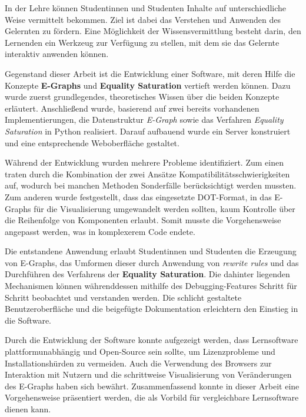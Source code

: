 In der Lehre können Studentinnen und Studenten Inhalte auf unterschiedliche Weise vermittelt bekommen. Ziel ist dabei das Verstehen und Anwenden des Gelernten zu fördern.
Eine Möglichkeit der Wissensvermittlung besteht darin, den Lernenden ein Werkzeug zur Verfügung zu stellen, mit dem sie das Gelernte interaktiv anwenden können.

Gegenstand dieser Arbeit ist die Entwicklung einer Software, mit deren Hilfe die Konzepte \textbf{E-Graphs} und \textbf{Equality Saturation} vertieft werden können.
Dazu wurde zuerst grundlegendes, theoretisches Wissen über die beiden Konzepte erläutert. 
Anschließend wurde, basierend auf zwei bereits vorhandenen Implementierungen, die Datenstruktur \textit{E-Graph} sowie das Verfahren \textit{Equality Saturation} in Python realisiert. 
Darauf aufbauend wurde ein Server konstruiert und eine entsprechende Weboberfläche gestaltet.

Während der Entwicklung wurden mehrere Probleme identifiziert. Zum einen traten durch die Kombination der zwei Ansätze Kompatibilitätsschwierigkeiten auf, wodurch bei manchen
Methoden Sonderfälle berücksichtigt werden mussten. Zum anderen wurde festgestellt, dass das eingesetzte DOT-Format, in das E-Graphs für die Visualisierung umgewandelt werden sollten, 
kaum Kontrolle über die Reihenfolge von Komponenten erlaubt. Somit musste die Vorgehensweise angepasst werden, was in komplexerem Code endete.

Die entstandene Anwendung erlaubt Studentinnen und Studenten die Erzeugung von E-Graphs, das Umformen dieser durch Anwendung von \textit{rewrite rules} und das Durchführen
des Verfahrens der \textbf{Equality Saturation}. Die dahinter liegenden Mechanismen können währenddessen mithilfe des Debugging-Features Schritt für Schritt beobachtet und verstanden werden.
Die schlicht gestaltete Benutzeroberfläche und die beigefügte Dokumentation erleichtern den Einstieg in die Software. 

Durch die Entwicklung der Software konnte aufgezeigt werden, dass Lernsoftware plattformunabhängig und Open-Source sein sollte, um Lizenzprobleme und Installationshürden zu vermeiden.
Auch die Verwendung des Browsers zur Interaktion mit Nutzern und die schrittweise Visualisierung von Veränderungen des E-Graphs haben sich bewährt. 
Zusammenfassend konnte in dieser Arbeit eine Vorgehensweise präsentiert werden, die als Vorbild für vergleichbare Lernsoftware dienen kann.

